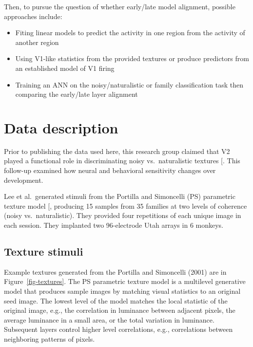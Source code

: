 \documentclass[
  11pt,
  letterpaper,
  DIV=11,
  numbers=noendperiod]{scrartcl}
\providecommand{\tightlist}{%
  \setlength{\itemsep}{0pt}\setlength{\parskip}{0pt}}
\begin{document}
Then, to pursue the question of whether early/late model alignment,
possible approaches include:

\begin{itemize}
\tightlist
\item
  Fiting linear models to predict the activity in one region from the
  activity of another region
\item
  Using V1-like statistics from the provided textures or produce
  predictors from an established model of V1 firing
\item
  Training an ANN on the noisy/naturalistic or family classification
  task then comparing the early/late layer alignment
\end{itemize}

\section{Data description}\label{data-description}

Prior to publishing the data used here, this research group claimed that
V2 played a functional role in discriminating noisy vs.~naturalistic
textures {[}\citeproc{ref-freeman_functional_2013}{7}{]}. This follow-up
examined how neural and behavioral sensitivity changes over development.

Lee et al.~generated stimuli from the Portilla and Simoncelli (PS)
parametric texture model
{[}\citeproc{ref-portilla_parametric_2000}{8}{]}, producing 15 samples
from 35 families at two levels of coherence (noisy vs.~naturalistic).
They provided four repetitions of each unique image in each session.
They implanted two 96-electrode Utah arrays in 6 monkeys.

\subsection{Texture stimuli}\label{texture-stimuli}

Example textures generated from the Portilla and Simoncelli (2001) are
in Figure~\ref{fig-textures}. The PS parametric texture model is a
multilevel generative model that produces sample images by matching
visual statistics to an original seed image. The lowest level of the
model matches the local statistic of the original image, e.g., the
correlation in luminance between adjacent pixels, the average luminance
in a small area, or the total variation in luminance. Subsequent layers
control higher level correlations, e.g., correlations between
neighboring patterns of pixels.
\end{document}

